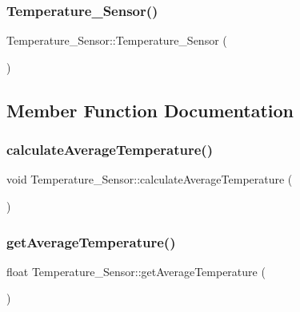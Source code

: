 \subsubsection{\texorpdfstring{Temperature\+\_\+\+Sensor()}{Temperature\_Sensor()}}
{\footnotesize\ttfamily Temperature\+\_\+\+Sensor\+::\+Temperature\+\_\+\+Sensor (\begin{DoxyParamCaption}{ }\end{DoxyParamCaption})}







\subsection{Member Function Documentation}
\mbox{\label{class_temperature___sensor_a40ebb3a74c2840e22264aaa61c0e7ec4}} 
\subsubsection{\texorpdfstring{calculate\+Average\+Temperature()}{calculateAverageTemperature()}}
{\footnotesize\ttfamily void Temperature\+\_\+\+Sensor\+::calculate\+Average\+Temperature (\begin{DoxyParamCaption}{ }\end{DoxyParamCaption})}





\mbox{\label{class_temperature___sensor_a2d3feee236f20096f59ee049c633d69f}} 
\subsubsection{\texorpdfstring{get\+Average\+Temperature()}{getAverageTemperature()}}
{\footnotesize\ttfamily float Temperature\+\_\+\+Sensor\+::get\+Average\+Temperature (\begin{DoxyParamCaption}{ }\end{DoxyParamCaption})}





